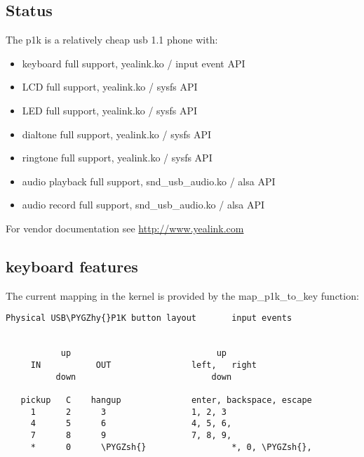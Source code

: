 \documentclass[a4paper,8pt,english]{sphinxmanual}
\def\PYGZsh{\char`\#}
\def\PYGZhy{\char`\-}
\begin{document}
\subsection{Status}
\label{input/devices/yealink:status}
The p1k is a relatively cheap usb 1.1 phone with:
\begin{itemize}
\item {} 
keyboard            full support, yealink.ko / input event API

\item {} 
LCD                 full support, yealink.ko / sysfs API

\item {} 
LED                 full support, yealink.ko / sysfs API

\item {} 
dialtone            full support, yealink.ko / sysfs API

\item {} 
ringtone            full support, yealink.ko / sysfs API

\item {} 
audio playback      full support, snd\_usb\_audio.ko / alsa API

\item {} 
audio record        full support, snd\_usb\_audio.ko / alsa API

\end{itemize}

For vendor documentation see \href{http://www.yealink.com}{http://www.yealink.com}


\subsection{keyboard features}
\label{input/devices/yealink:keyboard-features}
The current mapping in the kernel is provided by the map\_p1k\_to\_key
function:

\begin{Verbatim}[commandchars=\\\{\}]
Physical USB\PYGZhy{}P1K button layout       input events


           up                             up
     IN           OUT                left,   right
          down                           down

   pickup   C    hangup              enter, backspace, escape
     1      2      3                 1, 2, 3
     4      5      6                 4, 5, 6,
     7      8      9                 7, 8, 9,
     *      0      \PYGZsh{}                 *, 0, \PYGZsh{},
\end{Verbatim}
\end{document}
